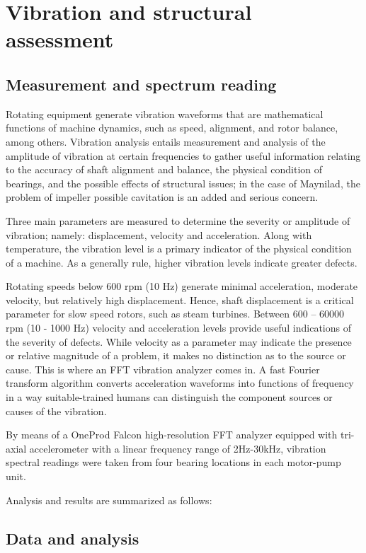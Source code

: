 \section{Vibration and structural assessment}
\label{45}
\subsection{Measurement and spectrum reading}
Rotating equipment generate vibration waveforms that are mathematical functions of machine dynamics, such as speed, alignment, and rotor balance, among others. Vibration analysis entails measurement and analysis of the amplitude of vibration at certain frequencies to gather useful information relating to the accuracy of shaft alignment and balance, the physical condition of bearings, and the possible effects of structural issues; in the case of Maynilad, the problem of impeller possible cavitation is an added and serious concern.

Three main parameters are measured to determine the severity or amplitude of vibration; namely: displacement, velocity and acceleration. Along with temperature, the vibration level is a primary indicator of the physical condition of a machine. As a generally rule, higher vibration levels indicate greater defects. 

Rotating speeds below 600 rpm (10 Hz) generate minimal acceleration, moderate velocity, but relatively high displacement. Hence, shaft displacement is a critical parameter for slow speed rotors, such as steam turbines. Between 600 – 60000 rpm (10 - 1000 Hz) velocity and acceleration levels provide useful indications of the severity of defects. While velocity as a parameter may indicate the presence or relative magnitude of a problem, it makes no distinction as to the source or cause. This is where an FFT vibration analyzer comes in. A fast Fourier transform algorithm converts acceleration waveforms into functions of frequency in a way suitable-trained humans can distinguish the component sources or causes of the vibration.

By means of a OneProd Falcon high-resolution FFT analyzer equipped with tri-axial accelerometer with a linear frequency range of 2Hz-30kHz, vibration spectral readings were taken from four bearing locations in each motor-pump unit. 

Analysis and results are summarized as follows:

\subsection{Data and analysis}

